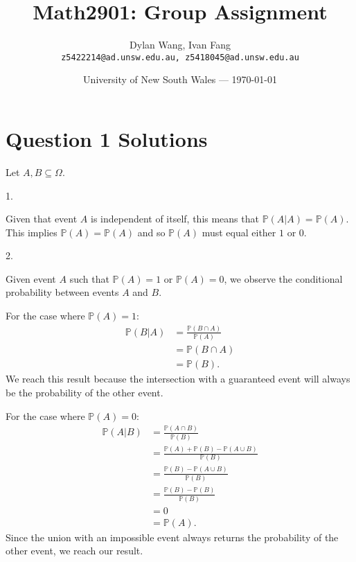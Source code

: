 \documentclass{article}
\title{Math2901: Group Assignment} %
\author{Dylan Wang, Ivan Fang\\ \texttt{z5422214@ad.unsw.edu.au, z5418045@ad.unsw.edu.au}} %
\date{University of New South Wales --- \today} %
\begin{document}
\maketitle %


\section*{Question 1 Solutions} %
Let $A, B\subseteq\Omega$.

1. 

Given that event $A$ is independent of itself, this means that $\mathbb{P}(A|A) = \mathbb{P}(A)$. This implies $\mathbb{P}(A) = \mathbb{P}(A)$ and so $\mathbb{P}(A)$ must equal either $1$ or $0$.

2.

Given event $A$ such that $\mathbb{P}(A) = 1$ or $\mathbb{P}(A) = 0$, we observe the conditional probability between events $A$ and $B$.

For the case where $\mathbb{P}(A) = 1$:
\begin{align*}
    \mathbb{P}(B|A) &= \frac{\mathbb{P}(B\cap A)}{\mathbb{P}(A)}\\
    &= \mathbb{P}(B\cap A)\\
    &= \mathbb{P}(B)\mbox{.}
\end{align*}
\hspace*{6mm}We reach this result because the intersection with a guaranteed event will always be the probability of the other event.

For the case where $\mathbb{P}(A) = 0$:
\begin{align*}
    \mathbb{P}(A|B) &= \frac{\mathbb{P}(A\cap B)}{\mathbb{P}(B)}\\
    &= \frac{\mathbb{P}(A) + \mathbb{P}(B) - \mathbb{P}(A\cup B)}{\mathbb{P}(B)}\\
    &= \frac{\mathbb{P}(B) - \mathbb{P}(A\cup B)}{\mathbb{P}(B)}\\
    &= \frac{\mathbb{P}(B) - \mathbb{P}(B)}{\mathbb{P}(B)}\\
    &= 0\\
    &= \mathbb{P}(A)\mbox{.}
\end{align*}
\hspace*{6mm} Since the union with an impossible event always returns the probability of the other event, we reach our result.
\end{document}
